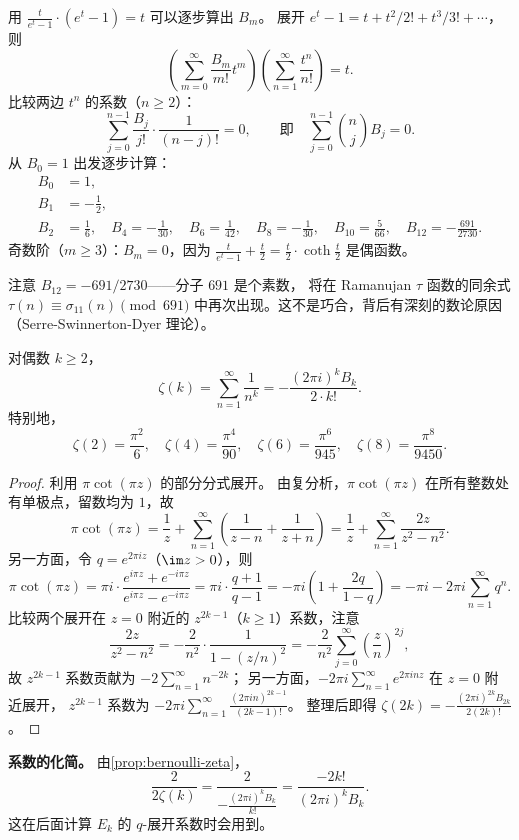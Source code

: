 \begin{example}
\label{ex:bernoulli-numbers}
用 $\frac{t}{e^t - 1} \cdot (e^t - 1) = t$ 可以逐步算出 $B_m$。
展开 $e^t - 1 = t + t^2/2! + t^3/3! + \cdots$，则
\[
  \left(\sum_{m=0}^{\infty} \frac{B_m}{m!} t^m\right)
  \left(\sum_{n=1}^{\infty} \frac{t^n}{n!}\right) = t.
\]
比较两边 $t^n$ 的系数（$n \geq 2$）：
\[
  \sum_{j=0}^{n-1} \frac{B_j}{j!} \cdot \frac{1}{(n-j)!} = 0,
  \qquad \text{即} \quad
  \sum_{j=0}^{n-1} \binom{n}{j} B_j = 0.
\]
从 $B_0 = 1$ 出发逐步计算：
\begin{align*}
  B_0 &= 1, \\
  B_1 &= -\frac{1}{2}, \\
  B_2 &= \frac{1}{6}, \quad B_4 = -\frac{1}{30}, \quad
  B_6 = \frac{1}{42}, \quad B_8 = -\frac{1}{30}, \quad
  B_{10} = \frac{5}{66}, \quad B_{12} = -\frac{691}{2730}.
\end{align*}
奇数阶（$m \geq 3$）：$B_m = 0$，因为
$\frac{t}{e^t-1} + \frac{t}{2} = \frac{t}{2} \cdot \coth\frac{t}{2}$
是偶函数。
\end{example}

注意 $B_{12} = -691/2730$——分子 $691$ 是个素数，
将在 Ramanujan $\tau$ 函数的同余式 $\tau(n) \equiv \sigma_{11}(n) \pmod{691}$
中再次出现。这不是巧合，背后有深刻的数论原因（Serre-Swinnerton-Dyer 理论）。

\begin{proposition}
\label{prop:bernoulli-zeta}
对偶数 $k \geq 2$，
\[
  \zeta(k) = \sum_{n=1}^{\infty} \frac{1}{n^k}
  = -\frac{(2\pi i)^k B_k}{2 \cdot k!}.
\]
特别地，
\[
  \zeta(2) = \frac{\pi^2}{6}, \quad
  \zeta(4) = \frac{\pi^4}{90}, \quad
  \zeta(6) = \frac{\pi^6}{945}, \quad
  \zeta(8) = \frac{\pi^8}{9450}.
\]
\end{proposition}

\begin{proof}
利用 $\pi \cot(\pi z)$ 的部分分式展开。
由复分析，$\pi \cot(\pi z)$ 在所有整数处有单极点，留数均为 $1$，故
\[
  \pi \cot(\pi z) = \frac{1}{z} + \sum_{n=1}^{\infty}
  \left(\frac{1}{z-n} + \frac{1}{z+n}\right)
  = \frac{1}{z} + \sum_{n=1}^{\infty} \frac{2z}{z^2 - n^2}.
\]
另一方面，令 $q = e^{2\pi i z}$（$\im z > 0$），则
\[
  \pi\cot(\pi z)
  = \pi i \cdot \frac{e^{i\pi z} + e^{-i\pi z}}{e^{i\pi z} - e^{-i\pi z}}
  = \pi i \cdot \frac{q + 1}{q - 1}
  = -\pi i \left(1 + \frac{2q}{1-q}\right)
  = -\pi i - 2\pi i \sum_{n=1}^{\infty} q^n.
\]
比较两个展开在 $z = 0$ 附近的 $z^{2k-1}$（$k \geq 1$）系数，注意
\[
  \frac{2z}{z^2 - n^2} = -\frac{2}{n^2} \cdot \frac{1}{1 - (z/n)^2}
  = -\frac{2}{n^2} \sum_{j=0}^{\infty} \left(\frac{z}{n}\right)^{2j},
\]
故 $z^{2k-1}$ 系数贡献为 $-2\sum_{n=1}^\infty n^{-2k}$；
另一方面，$-2\pi i \sum_{n=1}^{\infty} e^{2\pi inz}$ 在 $z = 0$ 附近展开，
$z^{2k-1}$ 系数为 $-2\pi i \sum_{n=1}^\infty \frac{(2\pi i n)^{2k-1}}{(2k-1)!}$。
整理后即得 $\zeta(2k) = -\frac{(2\pi i)^{2k} B_{2k}}{2(2k)!}$。
\end{proof}

\textbf{系数的化简。}
由\cref{prop:bernoulli-zeta}，
\[
  \frac{2}{2\zeta(k)} = \frac{2}{-\frac{(2\pi i)^k B_k}{k!}}
  = \frac{-2k!}{(2\pi i)^k B_k}.
\]
这在后面计算 $E_k$ 的 $q$-展开系数时会用到。


